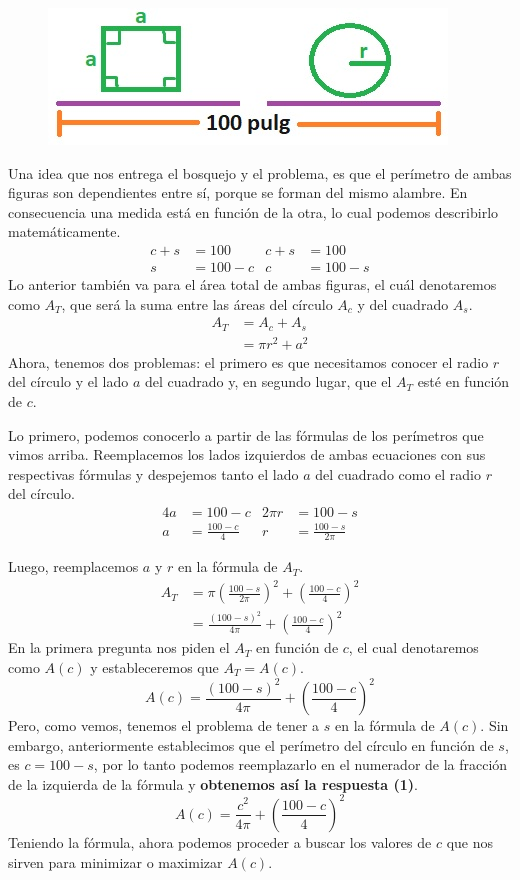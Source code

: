 \documentclass[12pt]{article}
\begin{document}
\begin{figure}[hbt!]
\centering
\includegraphics[scale=0.7]{img/opt-prob-2.jpg}
\end{figure}

Una idea que nos entrega el bosquejo y el problema, es que el perímetro de ambas figuras son dependientes entre sí, porque se forman del mismo alambre. En consecuencia una medida está en función de la otra, lo cual podemos describirlo matemáticamente.
\begin{align*}
c + s &= 100 & c + s &= 100 \\
s &= 100 - c & c &= 100 - s
\end{align*}
Lo anterior también va para el área total de ambas figuras, el cuál denotaremos como $A_{T}$, que será la suma entre las áreas del círculo $A_{c}$ y del cuadrado $A_{s}$.
\begin{align*}
A_{T} &= A_{c} + A_{s} \\
      &= \pi r^{2} + a^{2}
\end{align*}
Ahora, tenemos dos problemas: el primero es que necesitamos conocer el radio $r$ del círculo y el lado $a$ del cuadrado y, en segundo lugar, que el $A_{T}$ esté en función de $c$.

Lo primero, podemos conocerlo a partir de las fórmulas de los perímetros que vimos arriba. Reemplacemos los lados izquierdos de ambas ecuaciones con sus respectivas fórmulas y despejemos tanto el lado $a$ del cuadrado como el radio $r$ del círculo.
\begin{align*}
4a &= 100 - c & 2\pi r &= 100 - s \\
a &= \frac{100-c}{4} & r &= \frac{100-s}{2\pi}
\end{align*}

\newpage

Luego, reemplacemos $a$ y $r$ en la fórmula de $A_{T}$.
\begin{align*}
A_{T} &= \pi \left(\frac{100-s}{2\pi}\right)^{2} + 
         \left(\frac{100-c}{4}\right)^{2} \\
      &= \frac{(100-s)^{2}}{4\pi} + 
         \left(\frac{100-c}{4}\right)^{2}
\end{align*}
En la primera pregunta nos piden el $A_{T}$ en función de $c$, el cual denotaremos como $A(c)$ y estableceremos que $A_{T} = A(c)$.
\[
A(c) = \frac{(100-s)^{2}}{4\pi} + \left(\frac{100-c}{4}\right)^{2}
\]
Pero, como vemos, tenemos el problema de tener a $s$ en la fórmula de $A(c)$. Sin embargo, anteriormente establecimos que el perímetro del círculo en función de $s$, es $c = 100 - s$, por lo tanto podemos reemplazarlo en el numerador de la fracción de la izquierda de la fórmula y \textbf{obtenemos así la respuesta (1)}.
\[
	A(c) = \frac{c^{2}}{4\pi} + \left(\frac{100-c}{4}\right)^{2}
\]
Teniendo la fórmula, ahora podemos proceder a buscar los valores de $c$ que nos sirven para minimizar o maximizar $A(c)$.
\end{document}
